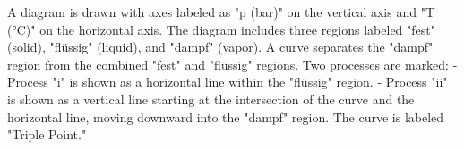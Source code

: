 A diagram is drawn with axes labeled as "p (bar)" on the vertical axis and "T (°C)" on the horizontal axis. The diagram includes three regions labeled "fest" (solid), "flüssig" (liquid), and "dampf" (vapor). A curve separates the "dampf" region from the combined "fest" and "flüssig" regions. Two processes are marked:  
- Process "i" is shown as a horizontal line within the "flüssig" region.  
- Process "ii" is shown as a vertical line starting at the intersection of the curve and the horizontal line, moving downward into the "dampf" region.  
The curve is labeled "Triple Point."